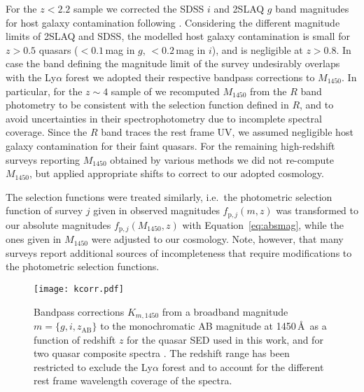 \documentclass[fleqn,usenatbib]{mnras}
\begin{document}
For the $z<2.2$ sample we corrected the SDSS $i$ and 2SLAQ $g$ band
magnitudes for host galaxy contamination following
\citet{2009MNRAS.392...19C}. Considering the different magnitude
limits of 2SLAQ and SDSS, the modelled host galaxy contamination is
small for $z>0.5$ quasars ($<0.1$\,mag in $g$, $<0.2$\,mag in $i$),
and is negligible at $z>0.8$.  In case the band defining the magnitude
limit of the survey undesirably overlaps with the Ly$\alpha$ forest
\citep{2010ApJ...710.1498G, 2011ApJ...728L..26G, 2013ApJ...768..105M}
we adopted their respective bandpass corrections to $M_{1450}$. In
particular, for the $z\sim 4$ sample of \citet{2010ApJ...710.1498G,
  2011ApJ...728L..26G} we recomputed $M_{1450}$ from the $R$ band
photometry to be consistent with the selection function defined in
$R$, and to avoid uncertainties in their spectrophotometry due to
incomplete spectral coverage. Since the \citet{2010ApJ...710.1498G,
  2011ApJ...728L..26G} $R$ band traces the rest frame UV, we assumed
negligible host galaxy contamination for their faint quasars. For the
remaining high-redshift surveys reporting $M_{1450}$ obtained by
various methods \citep{2010AJ....139..906W, 2011Natur.474..616M,
  2015ApJ...798...28K, 2015ApJ...801L..11V, 2016ApJ...829...33Y,
  2016ApJ...833..222J, 2018Natur.553..473B} we did not re-compute
$M_{1450}$, but applied appropriate shifts to correct to our adopted
cosmology.

The selection functions were treated similarly, i.e.\ the photometric
selection function of survey $j$ given in observed magnitudes
$f_{\mathrm{p},j}\left(m,z\right)$ \citep{2006AJ....131.2766R,
  2009MNRAS.392...19C, 2010ApJ...710.1498G, 2013ApJ...773...14R} was
transformed to our absolute magnitudes
$f_{\mathrm{p},j}\left(M_{1450},z\right)$ with
Equation~\ref{eq:absmag}, while the ones given in $M_{1450}$ were
adjusted to our cosmology. Note, however, that many surveys report
additional sources of incompleteness that require modifications to the
photometric selection functions.

\begin{figure}
    \texttt{[image: kcorr.pdf]}
  \caption{Bandpass corrections $K_{m,1450}$ from a broadband
    magnitude $m=\{g,i,z_\mathrm{AB}\}$ to the monochromatic AB
    magnitude at 1450\,\AA\ as a function of redshift $z$ for the
    \citet{2015MNRAS.449.4204L} quasar SED used in this work, and for
    two quasar composite spectra \citep{2001AJ....122..549V,
      2002ApJ...565..773T}.  The redshift range has been restricted to
    exclude the Ly$\alpha$ forest and to account for the different
    rest frame wavelength coverage of the spectra.}
  \label{fig:kcorr}
\end{figure}
\end{document}
